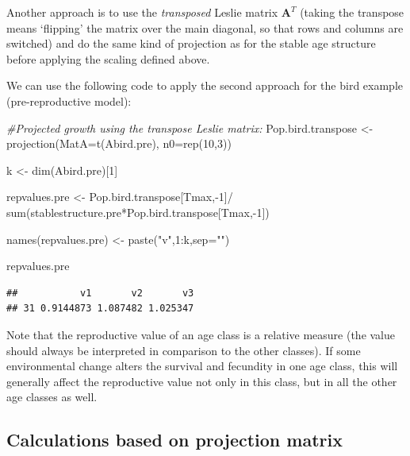 \documentclass[
]{book}
\newenvironment{Shaded}{\begin{snugshade}}{\end{snugshade}}
\newcommand{\AttributeTok}[1]{\textcolor[rgb]{0.77,0.63,0.00}{#1}}
\newcommand{\CommentTok}[1]{\textcolor[rgb]{0.56,0.35,0.01}{\textit{#1}}}
\newcommand{\DecValTok}[1]{\textcolor[rgb]{0.00,0.00,0.81}{#1}}
\newcommand{\FunctionTok}[1]{\textcolor[rgb]{0.00,0.00,0.00}{#1}}
\newcommand{\NormalTok}[1]{#1}
\newcommand{\OtherTok}[1]{\textcolor[rgb]{0.56,0.35,0.01}{#1}}
\newcommand{\SpecialCharTok}[1]{\textcolor[rgb]{0.00,0.00,0.00}{#1}}
\newcommand{\StringTok}[1]{\textcolor[rgb]{0.31,0.60,0.02}{#1}}
\begin{document}
Another approach is to use the \emph{transposed} Leslie matrix \(\mathbf{A}^T\) (taking the transpose means `flipping' the matrix over the main diagonal, so that rows and columns are switched) and do the same kind of projection as for the stable age structure before applying the scaling defined above.

We can use the following code to apply the second approach for the bird example (pre-reproductive model):

\begin{Shaded}
\begin{Highlighting}[]
\CommentTok{\#Projected growth using the transpose Leslie matrix:}
\NormalTok{Pop.bird.transpose }\OtherTok{\textless{}{-}} \FunctionTok{projection}\NormalTok{(}\AttributeTok{MatA=}\FunctionTok{t}\NormalTok{(Abird.pre), }\AttributeTok{n0=}\FunctionTok{rep}\NormalTok{(}\DecValTok{10}\NormalTok{,}\DecValTok{3}\NormalTok{)) }

\NormalTok{k }\OtherTok{\textless{}{-}} \FunctionTok{dim}\NormalTok{(Abird.pre)[}\DecValTok{1}\NormalTok{]}

\NormalTok{repvalues.pre }\OtherTok{\textless{}{-}}\NormalTok{ Pop.bird.transpose[Tmax,}\SpecialCharTok{{-}}\DecValTok{1}\NormalTok{]}\SpecialCharTok{/}
  \FunctionTok{sum}\NormalTok{(stablestructure.pre}\SpecialCharTok{*}\NormalTok{Pop.bird.transpose[Tmax,}\SpecialCharTok{{-}}\DecValTok{1}\NormalTok{])}

\FunctionTok{names}\NormalTok{(repvalues.pre) }\OtherTok{\textless{}{-}} \FunctionTok{paste}\NormalTok{(}\StringTok{"v"}\NormalTok{,}\DecValTok{1}\SpecialCharTok{:}\NormalTok{k,}\AttributeTok{sep=}\StringTok{""}\NormalTok{)}

\NormalTok{repvalues.pre}
\end{Highlighting}
\end{Shaded}

\begin{verbatim}
##           v1       v2       v3
## 31 0.9144873 1.087482 1.025347
\end{verbatim}

Note that the reproductive value of an age class is a relative measure (the value should always be interpreted in comparison to the other classes). If some environmental change alters the survival and fecundity in one age class, this will generally affect the reproductive value not only in this class, but in all the other age classes as well.

\hypertarget{eigen}{%
\subsection{Calculations based on projection matrix}\label{eigen}}
\end{document}
